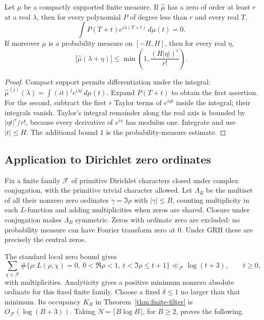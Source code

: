 \begin{corollary}
\label{cor:jet-robustness}
Let $\mu$ be a compactly supported finite measure. If $\widehat\mu$ has a zero of order at least $r$ at a real
$\lambda$, then for every polynomial $P$ of degree less than $r$ and
every real $T$,
\[
 \int P(T+t)e^{i\lambda(T+t)}\,d\mu(t)=0.
\]
If moreover $\mu$ is a probability measure on $[-H,H]$, then for every
real $\eta$,
\begin{equation}\label{eq:frequency-robustness}
 |\widehat\mu(\lambda+\eta)|
 \le\min\left(1,\frac{(H|\eta|)^r}{r!}\right).
\end{equation}
\end{corollary}

\begin{proof}
Compact support permits differentiation under the integral:
$\widehat\mu^{(j)}(\lambda)=\int(it)^je^{i\lambda t}\,d\mu(t)$.
Expand $P(T+t)$ to obtain the first assertion. For the second, subtract
the first $r$ Taylor terms of $e^{i\eta t}$ inside the integral; their
integrals vanish. Taylor's integral remainder along the real axis is
bounded by $|\eta t|^r/r!$, because every derivative of $e^{ix}$ has
modulus one. Integrate and use $|t|\le H$. The additional bound $1$ is
the probability-measure estimate.
\end{proof}

\subsection{Application to Dirichlet zero ordinates}

Fix a finite family $\mathcal F$ of primitive Dirichlet characters
closed under complex conjugation, with the primitive trivial
character allowed. Let
$\Lambda_B$ be the multiset of all their nonzero zero ordinates
$\gamma=\Im\rho$ with $|\gamma|\le B$, counting multiplicity in each
$L$-function and adding multiplicities when zeros are shared.
Closure under conjugation makes $\Lambda_B$ symmetric. Zeros with
ordinate zero are excluded: no probability measure can have Fourier
transform zero at $0$. Under GRH these are precisely the central zeros.

The standard local zero bound \cite{Davenport} gives
\begin{equation}\label{eq:local-zero-bound}
 \sum_{\chi\in\mathcal F}
 \#\{\rho:L(\rho,\chi)=0,\ 0<\Re\rho<1,\ t<\Im\rho\le t+1\}
 \ll_{\mathcal F}\log(t+3),\qquad t\ge0,
\end{equation}
with multiplicities. Analyticity gives a positive minimum nonzero
absolute ordinate for this fixed finite family. Choose a fixed
$\delta\le1$ no larger than that minimum. Its occupancy $K_B$ in
Theorem~\ref{thm:finite-filter} is $O_{\mathcal F}(\log(B+3))$.
Taking $N=\lceil B\log B\rceil$, for $B\ge2$, proves the following.


